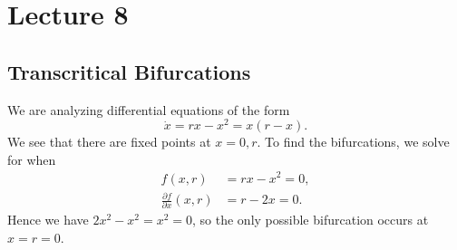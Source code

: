 \documentclass[class=article, crop=false]{standalone}
\begin{document}
  \section{Lecture 8}
  \subsection{Transcritical Bifurcations}
  We are analyzing differential equations of the form
  \[
    \dot{x} = rx - x^2 = x(r - x).
  \]
  We see that there are fixed points at $x = 0, r$. To find the bifurcations, we solve for when
  \begin{align*}
    f(x, r) &= rx - x^2 = 0, \\
    \frac{\partial f}{\partial x}(x, r) &= r - 2x = 0.
  \end{align*}
  Hence we have $2x^2 - x^2 = x^2 = 0$, so the only possible bifurcation occurs at $x = r = 0$.
\end{document}

